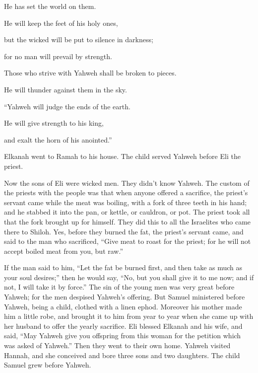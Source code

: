 {\par }{\QB He has set the world on them.
\par }{\Q {}He will keep the feet of his holy ones,
\par }{\QB but the wicked will be put to silence in darkness;
\par }{\QB for no man will prevail by strength.
\par }{\Q {}Those who strive with Yahweh shall be broken to pieces.
\par }{\QB He will thunder against them in the sky.
\par }{\BB \par }{\Q “Yahweh will judge the ends of the earth.
\par }{\QB He will give strength to his king,
\par }{\QB and exalt the horn of his anointed.”
\par }{\PP {}Elkanah went to Ramah to his house. The child served Yahweh before Eli the priest.
\par }{\PP {}Now the sons of Eli were wicked men. They didn’t know Yahweh.
The custom of the priests with the people was that when anyone offered a sacrifice, the priest’s servant came while the meat was boiling, with a fork of three teeth in his hand;
and he stabbed it into the pan, or kettle, or cauldron, or pot. The priest took all that the fork brought up for himself. They did this to all the Israelites who came there to Shiloh.
Yes, before they burned the fat, the priest’s servant came, and said to the man who sacrificed, “Give meat to roast for the priest; for he will not accept boiled meat from you, but raw.”
\par }{\PP {}If the man said to him, “Let the fat be burned first, and then take as much as your soul desires;” then he would say, “No, but you shall give it to me now; and if not, I will take it by force.”
The sin of the young men was very great before Yahweh; for the men despised Yahweh’s offering.
But Samuel ministered before Yahweh, being a child, clothed with a linen ephod.
Moreover his mother made him a little robe, and brought it to him from year to year when she came up with her husband to offer the yearly sacrifice.
Eli blessed Elkanah and his wife, and said, “May Yahweh give you offspring from this woman for the petition which was asked of Yahweh.” Then they went to their own home.
Yahweh visited Hannah, and she conceived and bore three sons and two daughters. The child Samuel grew before Yahweh.
}
